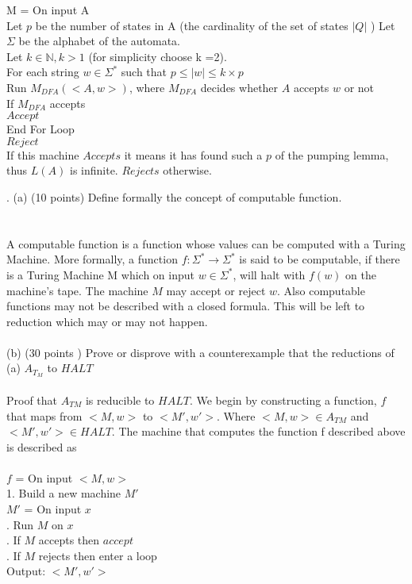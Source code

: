 \documentclass{report}
\newcommand{\me}[1]{
\begin{math}
#1
\end{math}
}
\begin{document}
 M = On input A \\
  Let $p$ be the number of states in A (the cardinality of the set of states \me{|Q|})
  Let $\Sigma$ be the alphabet of the automata. \\
  Let $k \in \mathbb{N}, k>1$ (for simplicity choose k =2).\\
  For each string \me{w \in \Sigma^*} such that \me{p \leq |w| \leq k\times p}\\
  \indent Run $M_{DFA}(<A,w>)$, where $M_{DFA}$ decides whether $A$ accepts $w$ or not \\
  \indent If $M_{DFA}$ accepts\\ 
  \indent \indent $Accept$ \\
  End For Loop \\
  $Reject$ \\
  
  If this machine $Accepts$ it means it has found such a $p$ of the pumping lemma, thus $L(A)$ is infinite. $Rejects$ otherwise.
  



. (a) (10 points) Define formally the concept of computable function. \\\\
\\
A computable function is a function whose values can be computed with a Turing Machine. More formally, a function \me{f:\Sigma^* \to \Sigma^*} is said to be computable, if there is a Turing Machine M which on input $w \in \Sigma^*$, will halt with $f(w)$ on the machine's tape. The machine $M$ may accept or reject $w$. Also computable functions may not be described with a closed formula. This will be left to reduction which may or may not happen. \\ \\
(b) (30 points ) Prove or disprove with a counterexample that the reductions of \\
\indent (a) $ A_{T_M}$ to $HALT $\\ \\ Proof that $A_{TM}$ is reducible to $HALT$. We begin by constructing a function, $f$ that maps from $<M,w>$ to $<M',w'>$. Where $<M,w> \in A_{TM}$ and $<M',w'> \in HALT$. The machine that computes the function f described above is described as \\ \\
$f$ = On input $<M,w>$ \\
1. Build a new machine $M'$ \\
$M'$ = On input $x$ \\
. Run $M$ on $x$ \\
. If $M$ accepts then $accept$\\
. If $M$ rejects then enter a loop\\
Output: $<M',w'>$  \\
\end{document}

